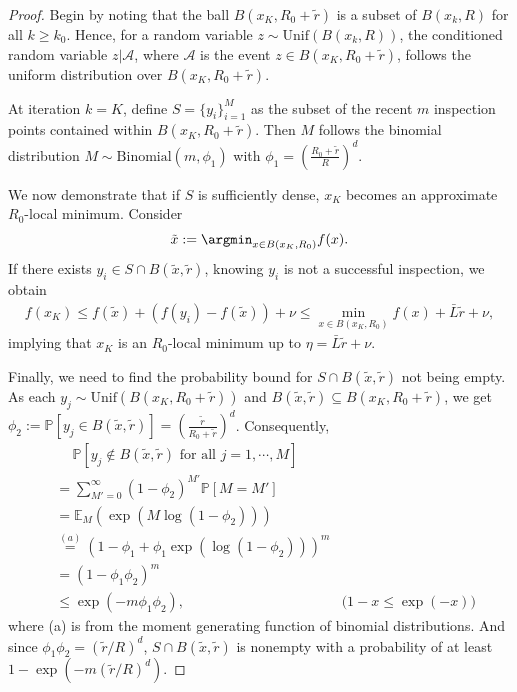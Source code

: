 \begin{proof}
    Begin by noting that the ball $B(x_K, R_0 + \tilde{r})$ is a subset of $B(x_{k}, R)$ for all $k \geq k_0$. Hence, for a random variable $z \sim \mathrm{Unif}(B(x_{k}, R))$, the conditioned random variable $z|\mathcal{A}$, where $\mathcal{A}$ is the event $z \in B(x_K, R_0 + \tilde{r})$, follows the uniform distribution over $B(x_K, R_0 + \tilde{r})$.

    At iteration $k= K$, define $S = \{y_i\}_{i=1}^{M}$ as the subset of the recent $m$ inspection points contained within $B(x_K, R_0 + \tilde{r})$. Then $M$ follows the binomial distribution $M \sim \mathrm{Binomial}( m , \phi_1)$ with $\phi_1 = \left(\frac{R_0  + \tilde{r}}{R}\right)^d$.
    
    We now demonstrate that if $S$ is sufficiently dense, $x_K$ becomes an approximate $R_0$-local minimum. Consider
    \begin{align*}
        \tilde{x} := \argmin_{x \in B(x_K, R_0)} f(x).
    \end{align*}
    If there exists $y_i \in S \cap B(\tilde{x},\tilde{r})$, knowing $y_i$ is not a successful inspection, we obtain 
    \begin{align*}
        f(x_K) \leq f(\tilde{x}) + (f(y_i) - f(\tilde{x})) + \nu
        \leq \min_{x \in B(x_K, R_0)}f(x) + \bar{L} \tilde{r} + \nu,
    \end{align*}
    implying that $x_K$ is an $R_0$-local minimum up to $\eta = \bar{L}\tilde{r} + \nu$.
    
    Finally, we need to find the probability bound for $S \cap B(\tilde{x}, \tilde{r})$ not being empty. As each $y_j \sim \mathrm{Unif}(B(x_K, R_0 + \tilde{r}))$ and $B(\tilde{x},\tilde{r}) \subseteq B(x_K, R_0 + \tilde{r})$, we get $\phi_2 := \mathbb{P}[y_j \in B(\tilde{x}, \tilde{r})] = \left(\frac{\tilde{r}}{R_0 + \tilde{r}}\right)^d$. Consequently,
    \begin{align*}
        & \quad~\mathbb{P}[y_j \not\in B(\tilde{x}, \tilde{r}) \text{ for all } j = 1, \cdots, M] \\
        & =\sum_{M' = 0}^{\infty} \left(1 - \phi_2\right)^{M'} \mathbb{P}[M = M'] \\
        & =\mathbb{E}_{M}(\exp{(M\log(1-\phi_2))}) \\
        & \stackrel{(a)}{=} (1-\phi_1 + \phi_1 \exp{(\log(1-\phi_2))})^m \\
        & = (1-\phi_1 \phi_2 )^m \\
        & \leq \exp(-m\phi_1 \phi_2), & \text{($1-x \leq \exp(-x)$)}
    \end{align*}
    where (a) is from the moment generating function of binomial distributions.
    And since $\phi_1 \phi_2 = (\tilde{r}/R)^d$, $S \cap B(\tilde{x}, \tilde{r})$ is nonempty with a probability of at least $1 - \exp(-m (\tilde{r}/R)^d)$.
\end{proof}

